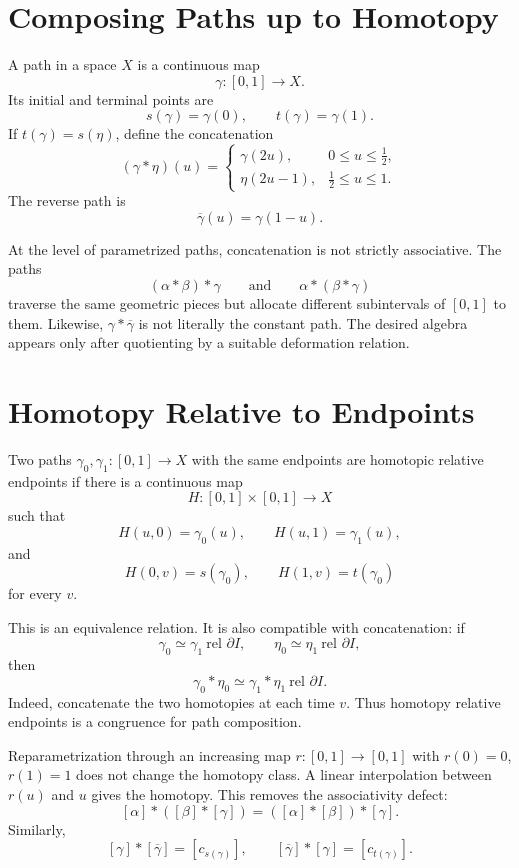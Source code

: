 
\section{Composing Paths up to Homotopy}

A path in a space \(X\) is a continuous map
\[
  \gamma:[0,1]\to X.
\]
Its initial and terminal points are
\[
  s(\gamma)=\gamma(0),
  \qquad
  t(\gamma)=\gamma(1).
\]
If \(t(\gamma)=s(\eta)\), define the concatenation
\[
  (\gamma*\eta)(u)=
  \begin{cases}
    \gamma(2u),&0\le u\le\frac12,\\
    \eta(2u-1),&\frac12\le u\le1.
  \end{cases}
\]
The reverse path is
\[
  \overline\gamma(u)=\gamma(1-u).
\]

At the level of parametrized paths, concatenation is not strictly associative.  The paths
\[
  (\alpha*\beta)*\gamma
  \qquad\text{and}\qquad
  \alpha*(\beta*\gamma)
\]
traverse the same geometric pieces but allocate different subintervals of \([0,1]\) to them.  Likewise, \(\gamma*\overline\gamma\) is not literally the constant path.  The desired algebra appears only after quotienting by a suitable deformation relation.

\section{Homotopy Relative to Endpoints}

Two paths \(\gamma_0,\gamma_1:[0,1]\to X\) with the same endpoints are homotopic relative endpoints if there is a continuous map
\[
  H:[0,1]\times[0,1]\to X
\]
such that
\[
  H(u,0)=\gamma_0(u),
  \qquad
  H(u,1)=\gamma_1(u),
\]
and
\[
  H(0,v)=s(\gamma_0),
  \qquad
  H(1,v)=t(\gamma_0)
\]
for every \(v\).

This is an equivalence relation.  It is also compatible with concatenation: if
\[
  \gamma_0\simeq\gamma_1\ \text{rel }\partial I,
  \qquad
  \eta_0\simeq\eta_1\ \text{rel }\partial I,
\]
then
\[
  \gamma_0*\eta_0\simeq\gamma_1*\eta_1\ \text{rel }\partial I.
\]
Indeed, concatenate the two homotopies at each time \(v\).  Thus homotopy relative endpoints is a congruence for path composition.

Reparametrization through an increasing map \(r:[0,1]\to[0,1]\) with \(r(0)=0\), \(r(1)=1\) does not change the homotopy class.  A linear interpolation between \(r(u)\) and \(u\) gives the homotopy.  This removes the associativity defect:
\[
  [\alpha]*([\beta]*[\gamma])
  =([\alpha]*[\beta])*[\gamma].
\]
Similarly,
\[
  [\gamma]*[\overline\gamma]=[c_{s(\gamma)}],
  \qquad
  [\overline\gamma]*[\gamma]=[c_{t(\gamma)}].
\]

